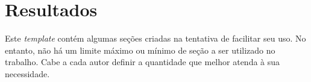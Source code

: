 \chapter{Resultados}

Este \textit{template} contém algumas seções criadas na tentativa de facilitar seu uso. No entanto, não há um limite máximo ou mínimo de seção a ser utilizado no trabalho. Cabe a cada autor definir a quantidade que melhor atenda à sua 
necessidade.
